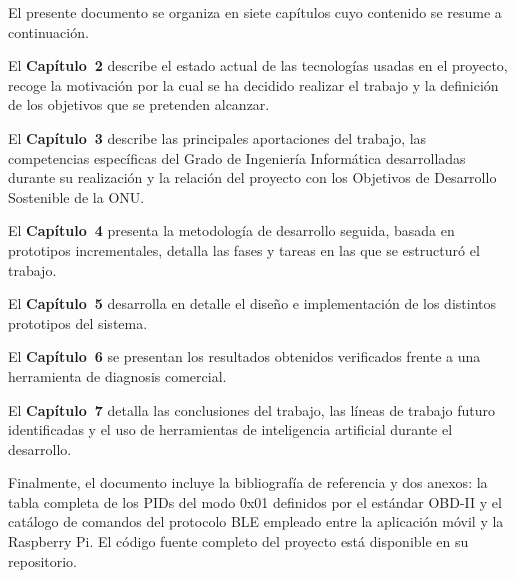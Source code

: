 El presente documento se organiza en siete capítulos cuyo contenido se resume a continuación.

El \textbf{Capítulo~2} describe el estado actual de las tecnologías usadas en el proyecto, recoge la motivación por la cual se ha decidido realizar el trabajo y la definición de los objetivos que se pretenden alcanzar.

El \textbf{Capítulo~3} describe las principales aportaciones del trabajo, las competencias específicas del Grado de Ingeniería Informática desarrolladas durante su realización y la relación del proyecto con los Objetivos de Desarrollo Sostenible de la ONU.

El \textbf{Capítulo~4} presenta la metodología de desarrollo seguida, basada en prototipos incrementales, detalla las fases y tareas en las que se estructuró el trabajo.

El \textbf{Capítulo~5} desarrolla en detalle el diseño e implementación de los distintos prototipos del sistema.

El \textbf{Capítulo~6} se presentan los resultados obtenidos verificados frente a una herramienta de diagnosis comercial.

El \textbf{Capítulo~7} detalla las conclusiones del trabajo, las líneas de trabajo futuro identificadas y el uso de herramientas de inteligencia artificial durante el desarrollo.

Finalmente, el documento incluye la bibliografía de referencia y dos anexos: la tabla completa de los PIDs del modo 0x01 definidos por el estándar OBD-II y el catálogo de comandos del protocolo BLE empleado entre la aplicación móvil y la Raspberry Pi. El código fuente completo del proyecto está disponible en su repositorio.
